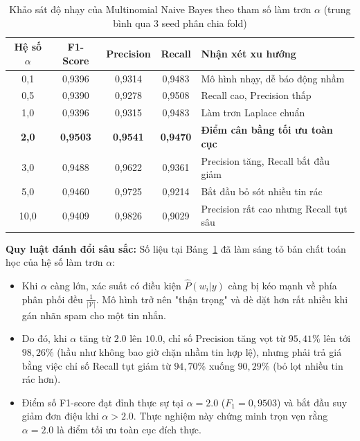 \begin{table}[H]
\centering
\caption{Khảo sát độ nhạy của Multinomial Naive Bayes theo tham số làm trơn $\alpha$ (trung bình qua 3 seed phân chia fold)}
\label{tab:nb-alpha-sensitivity}
\begin{tabular}{|c|c|c|c|l|}
\hline
\textbf{Hệ số $\alpha$} & \textbf{F1-Score} & \textbf{Precision} & \textbf{Recall} & \textbf{Nhận xét xu hướng} \\
\hline
0,1 & 0,9396 & 0,9314 & 0,9483 & Mô hình nhạy, dễ báo động nhầm \\
\hline
0,5 & 0,9390 & 0,9278 & 0,9508 & Recall cao, Precision thấp \\
\hline
1,0 & 0,9396 & 0,9315 & 0,9483 & Làm trơn Laplace chuẩn \\
\hline
\textbf{2,0} & \textbf{0,9503} & \textbf{0,9541} & \textbf{0,9470} & \textbf{Điểm cân bằng tối ưu toàn cục} \\
\hline
3,0 & 0,9488 & 0,9622 & 0,9361 & Precision tăng, Recall bắt đầu giảm \\
\hline
5,0 & 0,9460 & 0,9725 & 0,9214 & Bắt đầu bỏ sót nhiều tin rác \\
\hline
10,0 & 0,9409 & 0,9826 & 0,9029 & Precision rất cao nhưng Recall tụt sâu \\
\hline
\end{tabular}
\end{table}

\textbf{Quy luật đánh đổi sâu sắc:}
Số liệu tại Bảng~\ref{tab:nb-alpha-sensitivity} đã làm sáng tỏ bản chất toán học của hệ số làm trơn $\alpha$:
\begin{itemize}
    \item Khi $\alpha$ càng lớn, xác suất có điều kiện $\hat{P}(w_i|y)$ càng bị kéo mạnh về phía phân phối đều $\frac{1}{|\mathcal{V}|}$. Mô hình trở nên "thận trọng" và dè dặt hơn rất nhiều khi gán nhãn spam cho một tin nhắn.
    \item Do đó, khi $\alpha$ tăng từ $2.0$ lên $10.0$, chỉ số Precision tăng vọt từ $95,41\%$ lên tới \textbf{$98,26\%$} (hầu như không bao giờ chặn nhầm tin hợp lệ), nhưng phải trả giá bằng việc chỉ số Recall tụt giảm từ $94,70\%$ xuống \textbf{$90,29\%$} (bỏ lọt nhiều tin rác hơn).
    \item Điểm số F1-score đạt đỉnh thực sự tại $\alpha = 2.0$ ($F_1 = 0,9503$) và bắt đầu suy giảm đơn điệu khi $\alpha > 2.0$. Thực nghiệm này chứng minh trọn vẹn rằng $\alpha = 2.0$ là điểm tối ưu toàn cục đích thực.
\end{itemize}

